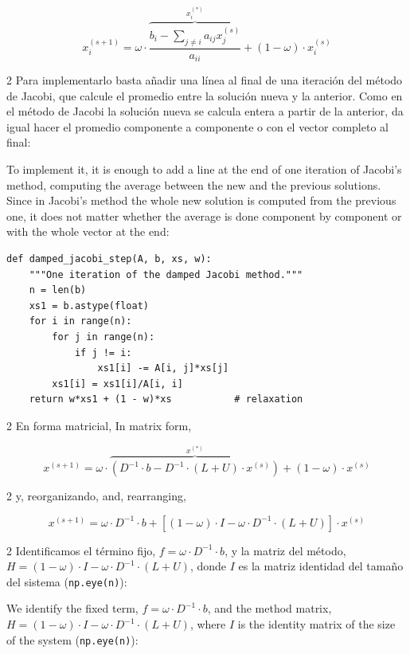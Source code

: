 \begin{equation*}
x_i^{(s+1)}=\omega\cdot \overbrace{\frac{b_i-\sum_{j\neq i}a_{ij}x_j^{(s)}}{a_{ii}}}^{x_i^{(*)}}+(1- \omega)\cdot x_i^{(s)}
\end{equation*}

\begin{paracol}{2}
Para implementarlo basta añadir una línea al final de una iteración del método de Jacobi, que calcule el promedio entre la solución nueva y la anterior. Como en el método de Jacobi la solución nueva se calcula entera a partir de la anterior, da igual hacer el promedio componente a componente o con el vector completo al final:

\switchcolumn
To implement it, it is enough to add a line at the end of one iteration of Jacobi's method, computing the average between the new and the previous solutions. Since in Jacobi's method the whole new solution is computed from the previous one, it does not matter whether the average is done component by component or with the whole vector at the end:
\end{paracol}

\begin{verbatim}
def damped_jacobi_step(A, b, xs, w):
    """One iteration of the damped Jacobi method."""
    n = len(b)
    xs1 = b.astype(float)
    for i in range(n):
        for j in range(n):
            if j != i:
                xs1[i] -= A[i, j]*xs[j]
        xs1[i] = xs1[i]/A[i, i]
    return w*xs1 + (1 - w)*xs           # relaxation
\end{verbatim}

\begin{paracol}{2}
En forma matricial,
\switchcolumn
In matrix form,
\end{paracol}
\begin{equation*}
x^{(s+1)}=\omega\cdot\overbrace{\left(D^{-1}\cdot b- D^{-1}\cdot\left(L+U\right)\cdot x^{(s)}\right)}^{x^{(*)}}+(1-\omega)\cdot x^{(s)}
\end{equation*}

\begin{paracol}{2}
y, reorganizando,
\switchcolumn
and, rearranging,
\end{paracol}

\begin{equation*}
x^{(s+1)}=\omega\cdot D^{-1}\cdot b+ \left[(1-\omega)\cdot I - \omega\cdot  D^{-1}\cdot  \left(L+U \right)\right]\cdot x^{(s)}
\end{equation*}

\begin{paracol}{2}
Identificamos el término fijo, $f=\omega\cdot D^{-1}\cdot b$, y la matriz del método, $H=(1-\omega)\cdot I - \omega\cdot  D^{-1}\cdot  \left(L+U \right)$, donde $I$ es la matriz identidad del tamaño del sistema (\texttt{np.eye(n)}):

\switchcolumn
We identify the fixed term, $f=\omega\cdot D^{-1}\cdot b$, and the method matrix, $H=(1-\omega)\cdot I - \omega\cdot  D^{-1}\cdot  \left(L+U \right)$, where $I$ is the identity matrix of the size of the system (\texttt{np.eye(n)}):
\end{paracol}

